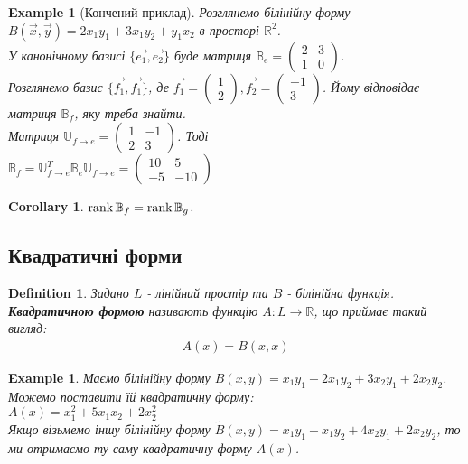 \documentclass[a4paper, 10pt]{article}
\theoremstyle{theoremdd}
\newtheorem{definition}[theorem]{Definition}
\newtheorem{example}[theorem]{Example}
\newtheorem{corollary}[theorem]{Corollary}
\begin{document}
\begin{example}[Кончений приклад]
Розглянемо білінійну форму $B(\vec{x},\vec{y}) = 2x_1y_1 + 3x_1y_2 + y_1x_2$ в просторі $\mathbb{R}^2$.\\
У канонічному базисі $\{\vec{e_1},\vec{e_2}\}$ буде матриця $\mathbb{B}_e = \begin{pmatrix}
2 & 3 \\
1 & 0
\end{pmatrix}$.\\
Розглянемо базис $\{ \vec{f_1}, \vec{f_1} \}$, де $\vec{f_1} = \begin{pmatrix}
1 \\ 2
\end{pmatrix}, \vec{f_2} = \begin{pmatrix}
-1 \\ 3
\end{pmatrix}$. Йому відповідає матриця $\mathbb{B}_f$, яку треба знайти.\\
Матриця $\mathbb{U}_{f \to e} = \begin{pmatrix}
1 & -1 \\
2 & 3
\end{pmatrix}$. Тоді\\
$\mathbb{B}_f = \mathbb{U}^T_{f \to e} \mathbb{B}_e \mathbb{U}_{f \to e} = \begin{pmatrix}
10 & 5 \\
-5 & -10
\end{pmatrix}$
\end{example}

\begin{corollary}
$\rank \mathbb{B}_f = \rank \mathbb{B}_g$.
\end{corollary}

\subsection{Квадратичні форми}
\begin{definition}
Задано $L$ - лінійний простір та $B$ - білінійна функція.\\
\textbf{Квадратичною формою} називають функцію $A: L \to \mathbb{R}$, що приймає такий вигляд:
\begin{align*}
A(x) = B(x,x)
\end{align*}
\end{definition}

\begin{example}
Маємо білінійну форму $B(x,y) = x_1y_1 + 2x_1y_2 + 3x_2y_1 + 2x_2y_2$. Можемо поставити їй квадратичну форму:\\
$A(x) = x_1^2 + 5x_1x_2 + 2x_2^2$
\bigskip \\
Якщо візьмемо іншу білінійну форму $\tilde{B}(x,y) = x_1y_1 + x_1y_2 + 4x_2y_1 + 2x_2y_2$, то ми отримаємо ту саму квадратичну форму $A(x)$.
\end{example}
\end{document}
